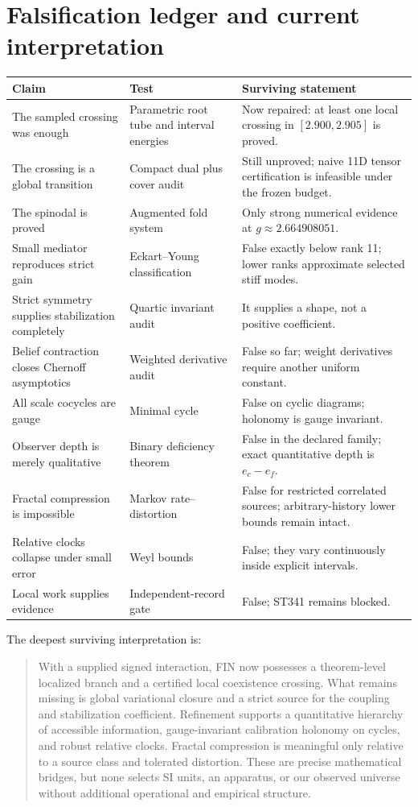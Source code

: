 \documentclass[11pt,a4paper]{article}
\begin{document}
\section{Falsification ledger and current interpretation}
\begin{longtable}{p{}p{}p{}}
\toprule Claim&Test&Surviving statement\\\midrule\endhead
The sampled crossing was enough&Parametric root tube and interval energies&Now repaired: at least one local crossing in $[2.900,2.905]$ is proved.\\
The crossing is a global transition&Compact dual plus cover audit&Still unproved; naive 11D tensor certification is infeasible under the frozen budget.\\
The spinodal is proved&Augmented fold system&Only strong numerical evidence at $g\approx2.664908051$.\\
Small mediator reproduces strict gain&Eckart--Young classification&False exactly below rank 11; lower ranks approximate selected stiff modes.\\
Strict symmetry supplies stabilization completely&Quartic invariant audit&It supplies a shape, not a positive coefficient.\\
Belief contraction closes Chernoff asymptotics&Weighted derivative audit&False so far; weight derivatives require another uniform constant.\\
All scale cocycles are gauge&Minimal cycle&False on cyclic diagrams; holonomy is gauge invariant.\\
Observer depth is merely qualitative&Binary deficiency theorem&False in the declared family; exact quantitative depth is $e_c-e_f$.\\
Fractal compression is impossible&Markov rate--distortion&False for restricted correlated sources; arbitrary-history lower bounds remain intact.\\
Relative clocks collapse under small error&Weyl bounds&False; they vary continuously inside explicit intervals.\\
Local work supplies evidence&Independent-record gate&False; ST341 remains blocked.\\
\bottomrule\end{longtable}

The deepest surviving interpretation is:
\begin{quote}
With a supplied signed interaction, FIN now possesses a theorem-level localized branch and
a certified local coexistence crossing. What remains missing is global variational closure
and a strict source for the coupling and stabilization coefficient. Refinement supports a
quantitative hierarchy of accessible information, gauge-invariant calibration holonomy on
cycles, and robust relative clocks. Fractal compression is meaningful only relative to a
source class and tolerated distortion. These are precise mathematical bridges, but none
selects SI units, an apparatus, or our observed universe without additional operational and
empirical structure.
\end{quote}
\end{document}
